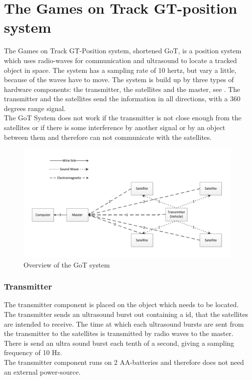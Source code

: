 \section{The Games on Track GT-position system}
\label{GoTDescription}
The Games on Track GT-Position system, shortened GoT, is a position system which uses radio-waves for communication and ultrasound to locate a tracked object in space. The system has a sampling rate of 10 hertz, but vary a little, because of the waves have to move. The system is build up by three types of hardware components: the transmitter, the satellites and the master, see . The transmitter and the satellites send the information in all directions, with a 360 degrees range signal.\\
The GoT System does not work if the transmitter is not close enough from the satellites or if there is some interference by another signal or by an object between them and therefore can not communicate with the satellites.

\begin{figure}[H]
	\centering
	\includegraphics[scale=0.6]{figures/GoT_description.pdf}
	\caption{Overview of the GoT system}
	\label{GoTSystem}
\end{figure}

\subsubsection{Transmitter}
The transmitter component is placed on the object which needs to be located. The transmitter sends an ultrasound burst out containing a id, that the satellites are intended to receive. The time at which each ultrasound bursts are sent from the transmitter to the satellites is transmitted by radio waves to the master. There is send an ultra sound burst each tenth of a second, giving a sampling frequency of 10 Hz.\\ 
The transmitter component runs on 2 AA-batteries and therefore does not need an external power-source.

